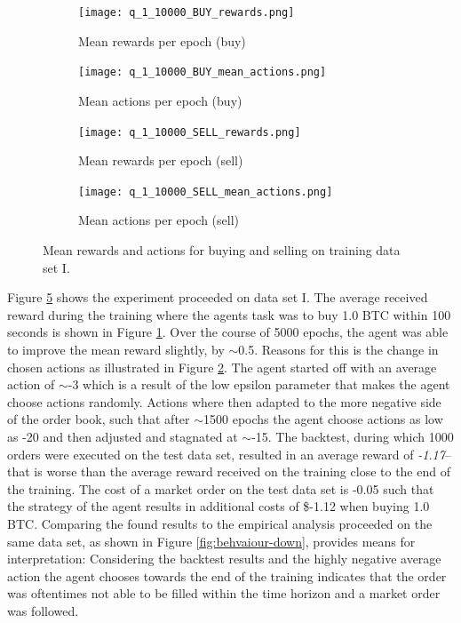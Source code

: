 \begin{figure}[H]
    \centering
    \begin{subfigure}[b]{0.45\textwidth}
        \texttt{[image: q\_1\_10000\_BUY\_rewards.png]}
        \caption{Mean rewards per epoch (buy)}
        \label{fig:analysis-q-learn-1-reward-buy}
    \end{subfigure}
    \begin{subfigure}[b]{0.45\textwidth}
        \texttt{[image: q\_1\_10000\_BUY\_mean\_actions.png]}
        \caption{Mean actions per epoch (buy)}
        \label{fig:analysis-q-learn-1-action-buy}
    \end{subfigure}
    \begin{subfigure}[b]{0.45\textwidth}
        \texttt{[image: q\_1\_10000\_SELL\_rewards.png]}
        \caption{Mean rewards per epoch (sell)}
        \label{fig:analysis-q-learn-1-reward-sell}
    \end{subfigure}
    \begin{subfigure}[b]{0.45\textwidth}
        \texttt{[image: q\_1\_10000\_SELL\_mean\_actions.png]}
        \caption{Mean actions per epoch (sell)}
        \label{fig:analysis-q-learn-1-action-sell}
    \end{subfigure}
    \caption{Mean rewards and actions for buying and selling on training data set I.}
    \label{fig:analysis-q-learn-1}
\end{figure}

Figure \ref{fig:analysis-q-learn-1} shows the experiment proceeded on data set I.
The average received reward during the training where the agents task was to buy 1.0 BTC within 100 seconds is shown in Figure \ref{fig:analysis-q-learn-1-reward-buy}.
Over the course of 5000 epochs, the agent was able to improve the mean reward slightly, by $\sim$0.5.
Reasons for this is the change in chosen actions as illustrated in Figure \ref{fig:analysis-q-learn-1-action-buy}.
The agent started off with an average action of $\sim$-3 which is a result of the low epsilon parameter that makes the agent choose actions randomly.
Actions where then adapted to the more negative side of the order book, such that after $\sim$1500 epochs the agent choose actions as low as -20 and then adjusted and stagnated at $\sim$-15.
The backtest, during which 1000 orders were executed on the test data set, resulted in an average reward of \textit{-1.17}--that is worse than the average reward received on the training close to the end of the training.
The cost of a market order on the test data set is -0.05 such that the strategy of the agent results in additional costs of \$-1.12 when buying 1.0 BTC.
Comparing the found results to the empirical analysis proceeded on the same data set, as shown in Figure \ref{fig:behvaiour-down}, provides means for interpretation:
Considering the backtest results and the highly negative average action the agent chooses towards the end of the training indicates that the order was oftentimes not able to be filled within the time horizon and a market order was followed.

